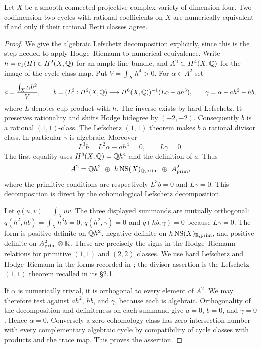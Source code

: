 \begin{theorem}\label{thm:B1a-betti}
Let $X$ be a smooth connected projective complex variety of dimension four.
Two codimension-two cycles with rational coefficients on $X$ are numerically
equivalent if and only if their rational Betti classes agree.
\end{theorem}
\begin{proof}
We give the algebraic Lefschetz decomposition explicitly, since this is the
step needed to apply Hodge--Riemann to numerical equivalence. Write
$h=c_1(H)\in H^2(X,{\mathbb{Q}})$ for an ample line bundle, and
$A^2\subset H^4(X,{\mathbb{Q}})$ for the image of the cycle-class map. Put
$V=\int_Xh^4>0$. For $\alpha\in A^2$ set
\[
 a=\frac{\int_X\alpha h^2}{V},\qquad
 b=(L^2:H^2(X,{\mathbb{Q}})\longrightarrow H^6(X,{\mathbb{Q}}))^{-1}
       (L\alpha-a h^3),\qquad
 \gamma=\alpha-a h^2-hb,
\]
where $L$ denotes cup product with $h$. The inverse exists by hard Lefschetz.
It preserves rationality and shifts Hodge bidegree by $(-2,-2)$.
Consequently $b$ is a rational $(1,1)$-class. The Lefschetz $(1,1)$ theorem
makes $b$ a rational divisor class. In particular $\gamma$ is algebraic.
Moreover
\[
 L^3b=L^2\alpha-a h^4=0,\qquad L\gamma=0.
\]
The first equality uses $H^8(X,{\mathbb{Q}})={\mathbb{Q}} h^4$ and the definition of $a$.
Thus
\[
 A^2=\Q h^2\ \oplus\ h\operatorname{NS}(X)_{\Q,\mathrm{prim}}
          \ \oplus\ A^2_{\mathrm{prim}},
\]
where the primitive conditions are respectively $L^3b=0$ and $L\gamma=0$.
This decomposition is direct by the cohomological Lefschetz decomposition.

Let $q(u,v)=\int_Xuv$. The three displayed summands are mutually
orthogonal: $q(h^2,hb)=\int_Xh^3b=0$;
$q(h^2,\gamma)=0$ and $q(hb,\gamma)=0$ because $L\gamma=0$.
The form is positive definite on ${\mathbb{Q}} h^2$, negative definite on
$h\operatorname{NS}(X)_{{\mathbb{R}},\mathrm{prim}}$, and positive definite on
$A^2_{\mathrm{prim}}\otimes{\ensuremath{\mathbb{R}}}$. These are precisely the signs in the
Hodge--Riemann relations for primitive $(1,1)$ and $(2,2)$ classes.
We use hard Lefschetz and Hodge--Riemann in the forms recorded in
\cite[\S2.2, Theorems 2.10--2.12]{BVoisin2010}; the divisor assertion is
the Lefschetz $(1,1)$ theorem recalled in its \S2.1.

If $\alpha$ is numerically trivial, it is orthogonal to every element of
$A^2$. We may therefore test against $a h^2$, $hb$, and $\gamma$, because
each is algebraic. Orthogonality of the decomposition and definiteness on
each summand give $a=0$, $b=0$, and $\gamma=0$. Hence $\alpha=0$.
Conversely a zero cohomology class has zero intersection number with every
complementary algebraic cycle by compatibility of cycle classes with
products and the trace map. This proves the assertion.
\end{proof}

